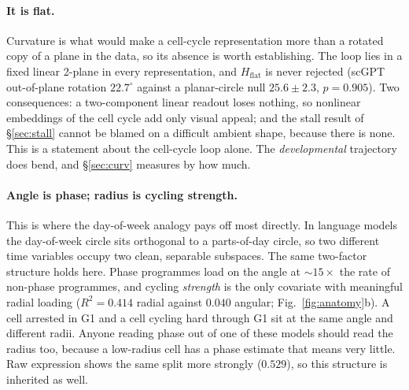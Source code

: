 \documentclass[11pt]{article}
\begin{document}
\paragraph{It is flat.} Curvature is what would make a cell-cycle representation more than a rotated
copy of a plane in the data, so its absence is worth establishing. The loop lies in a fixed linear 2-plane in every
representation, and $H_{\text{flat}}$ is never rejected (scGPT out-of-plane rotation $22.7^\circ$
against a planar-circle null $25.6\pm2.3$, $p=0.905$). Two consequences: a two-component linear
readout loses nothing, so nonlinear embeddings of the cell cycle add only visual appeal; and the stall
result of \S\ref{sec:stall} cannot be blamed on a difficult ambient shape, because there is none. This
is a statement about the cell-cycle loop alone. The \emph{developmental} trajectory does bend, and
\S\ref{sec:curv} measures by how much.

\paragraph{Angle is phase; radius is cycling strength.} This is where the day-of-week analogy pays off
most directly. In language models the day-of-week circle sits orthogonal to a parts-of-day circle, so
two different time variables occupy two clean, separable subspaces. The same two-factor structure holds
here. Phase programmes load on the angle at ${\sim}15\times$ the rate of non-phase programmes, and
cycling \emph{strength} is the only covariate with meaningful radial loading ($R^2=0.414$ radial
against $0.040$ angular; Fig.~\ref{fig:anatomy}b). A cell arrested in G1 and a cell cycling hard
through G1 sit at the same angle and different radii. Anyone reading phase out of one of these models
should read the radius too, because a low-radius cell has a phase estimate that means very little. Raw
expression shows the same split more strongly ($0.529$), so this structure is inherited as well.
\end{document}
